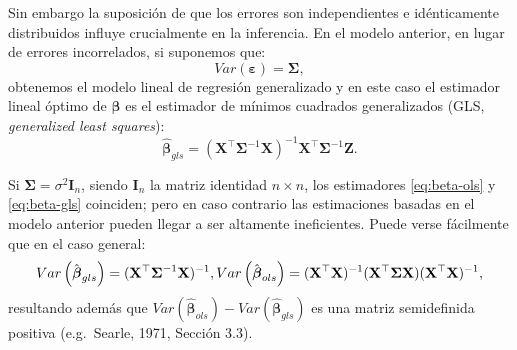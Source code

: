 \documentclass[
]{book}
\theoremstyle{break}
\theoremstyle{definition}
\theoremstyle{definition}
\theoremstyle{definition}
\theoremstyle{definition}
\theoremstyle{remark}
\begin{document}
Sin embargo la suposición de que los errores son independientes e idénticamente distribuidos influye crucialmente en la inferencia.
En el modelo anterior, en lugar de errores incorrelados, si suponemos que:
\[Var\left( \boldsymbol{\varepsilon} \right) =\boldsymbol{\Sigma},\]
obtenemos el modelo lineal de regresión generalizado y en este caso el estimador lineal óptimo de \(\boldsymbol{\beta}\) es el estimador de mínimos cuadrados generalizados (GLS, \emph{generalized least squares}):
\begin{equation} 
  \hat{\boldsymbol{\beta}}_{gls} =(\mathbf{X}^{\top}\boldsymbol{\Sigma}^{-1} \mathbf{X})^{-1} \mathbf{X}^{\top}\boldsymbol{\Sigma}^{-1} \mathbf{Z}.
  \label{eq:beta-gls}
\end{equation}

Si \(\boldsymbol{\Sigma}=\sigma^{2} \mathbf{I}_{n}\), siendo \(\mathbf{I}_{n}\) la matriz identidad \(n\times n\), los estimadores \eqref{eq:beta-ols} y \eqref{eq:beta-gls} coinciden; pero en caso contrario las estimaciones basadas en el modelo anterior pueden llegar a ser altamente ineficientes.
Puede verse fácilmente que en el caso general:
\[Var\left( \hat{\boldsymbol{\beta}}_{gls} \right)=(\mathbf{X}^{\top}\boldsymbol{\Sigma}^{-1} \mathbf{X})^{-1}, \\
Var\left( \hat{\boldsymbol{\beta}}_{ols} \right) =(\mathbf{X}^{\top}\mathbf{X})^{-1} (\mathbf{X}^{\top}\boldsymbol{\Sigma}\mathbf{X})(\mathbf{X}^{\top}\mathbf{X})^{-1},\]
resultando además que \(Var( \hat{\boldsymbol{\beta}}_{ols}) - Var( \hat{\boldsymbol{\beta}}_{gls} )\) es una matriz semidefinida positiva (e.g.~Searle, 1971, Sección 3.3).
\end{document}
